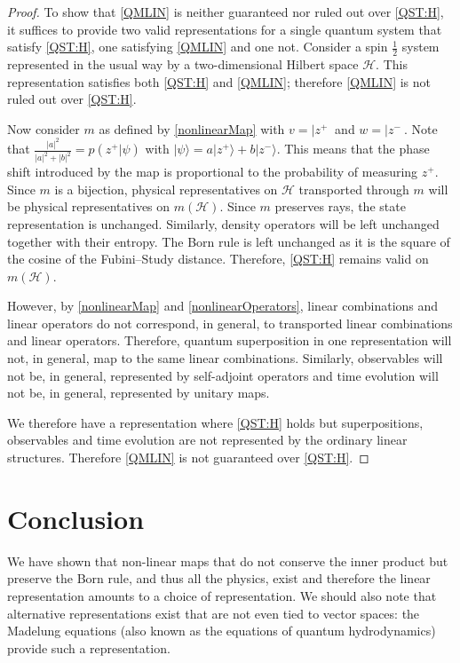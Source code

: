 \documentclass{techbrief}
\begin{document}
\begin{proof}
	To show that \ref{QMLIN} is neither guaranteed nor ruled out over \ref{QST:H}, it suffices to provide two valid representations for a single quantum system that satisfy \ref{QST:H}, one satisfying \ref{QMLIN} and one not. Consider a spin $\frac{1}{2}$ system represented in the usual way by a two-dimensional Hilbert space $\mathcal{H}$. This representation satisfies both \ref{QST:H} and \ref{QMLIN}; therefore \ref{QMLIN} is not ruled out over \ref{QST:H}.
	
	Now consider $m$ as defined by \ref{nonlinearMap} with $v = |z^+\>$ and $w = | z^- \>$. Note that $\frac{|a|^2}{|a|^2+|b|^2} = p(z^+|\psi)$ with $|\psi\rangle=a|z^+\rangle+b|z^-\rangle$. This means that the phase shift introduced by the map is proportional to the probability of measuring $z^+$. Since $m$ is a bijection, physical representatives on $\mathcal{H}$ transported through $m$ will be physical representatives on $m(\mathcal{H})$. Since $m$ preserves rays, the state representation is unchanged. Similarly, density operators will be left unchanged together with their entropy. The Born rule is left unchanged as it is the square of the cosine of the Fubini--Study distance. Therefore, \ref{QST:H} remains valid on $m(\mathcal{H})$.
	
	However, by \ref{nonlinearMap} and \ref{nonlinearOperators}, linear combinations and linear operators do not correspond, in general, to transported linear combinations and linear operators. Therefore, quantum superposition in one representation will not, in general, map to the same linear combinations. Similarly, observables will not be, in general, represented by self-adjoint operators and time evolution will not be, in general, represented by unitary maps.
	
	We therefore have a representation where \ref{QST:H} holds but superpositions, observables and time evolution are not represented by the ordinary linear structures. Therefore \ref{QMLIN} is not guaranteed over \ref{QST:H}.
\end{proof}	

\section{Conclusion}

We have shown that non-linear maps that do not conserve the inner product but preserve the Born rule, and thus all the physics, exist and therefore the linear representation amounts to a choice of representation. We should also note that alternative representations exist that are not even tied to vector spaces: the Madelung equations (also known as the equations of quantum hydrodynamics) provide such a representation.
\end{document}
